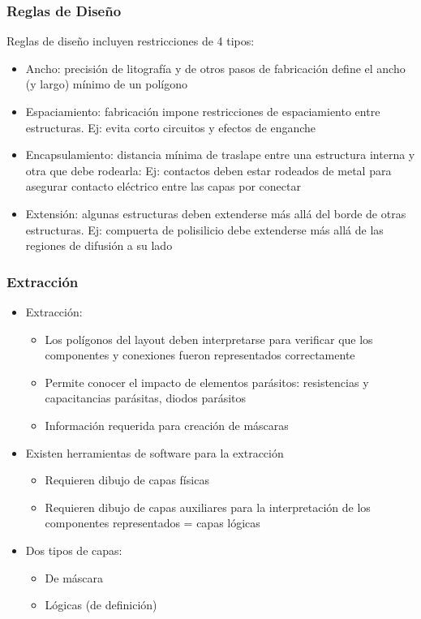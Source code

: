 \documentclass[aspectratio=169,10pt]{beamer}
\begin{document}
\begin{frame}[t]
\frametitle{Reglas de Diseño}
Reglas de diseño incluyen restricciones de 4 tipos:

\begin{itemize}
\item Ancho: precisión de litografía y de otros pasos de fabricación define el ancho (y largo) mínimo de un polígono
\item Espaciamiento: fabricación impone restricciones de espaciamiento entre estructuras. Ej: evita corto circuitos y efectos de enganche
\item Encapsulamiento: distancia mínima de traslape entre una estructura interna y otra que debe rodearla: Ej: contactos deben estar rodeados de metal para asegurar contacto eléctrico entre las capas por conectar
\item Extensión: algunas estructuras deben extenderse más allá del borde de otras estructuras. Ej: compuerta de polisilicio debe extenderse más allá de las regiones de difusión a su lado
\end{itemize}
\end{frame}


\begin{frame}[t]
\frametitle{Extracción}
\begin{itemize}
	\item Extracción:
	\begin{itemize}
		\item Los polígonos del layout deben interpretarse para verificar que los componentes y conexiones fueron representados correctamente
		\item Permite conocer el impacto de elementos parásitos: resistencias y capacitancias parásitas, diodos parásitos
		\item Información requerida para creación de máscaras
	\end{itemize}
	\item Existen herramientas de software para la extracción
	\begin{itemize}
		\item Requieren dibujo de capas físicas
		\item Requieren dibujo de capas auxiliares para la interpretación de los componentes representados = capas lógicas
	\end{itemize}
	\item Dos tipos de capas:
	\begin{itemize}
		\item De máscara
		\item Lógicas (de definición)	
	\end{itemize}
\end{itemize}
\end{frame}
\end{document}
